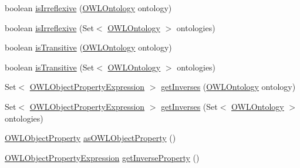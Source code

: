 \begin{DoxyCompactItemize}
\item 
boolean \hyperlink{interfaceorg_1_1semanticweb_1_1owlapi_1_1model_1_1_o_w_l_object_property_expression_a9dac56c597c83874b6a23fb84409faa5}{is\-Irreflexive} (\hyperlink{interfaceorg_1_1semanticweb_1_1owlapi_1_1model_1_1_o_w_l_ontology}{O\-W\-L\-Ontology} ontology)
\item 
boolean \hyperlink{interfaceorg_1_1semanticweb_1_1owlapi_1_1model_1_1_o_w_l_object_property_expression_a820c2a3db23b2416949239ac1141fb5b}{is\-Irreflexive} (Set$<$ \hyperlink{interfaceorg_1_1semanticweb_1_1owlapi_1_1model_1_1_o_w_l_ontology}{O\-W\-L\-Ontology} $>$ ontologies)
\item 
boolean \hyperlink{interfaceorg_1_1semanticweb_1_1owlapi_1_1model_1_1_o_w_l_object_property_expression_acfe60cc89882d04b17c6fb54017e360a}{is\-Transitive} (\hyperlink{interfaceorg_1_1semanticweb_1_1owlapi_1_1model_1_1_o_w_l_ontology}{O\-W\-L\-Ontology} ontology)
\item 
boolean \hyperlink{interfaceorg_1_1semanticweb_1_1owlapi_1_1model_1_1_o_w_l_object_property_expression_a8e7fcc73fe6a78c637a12997a713c186}{is\-Transitive} (Set$<$ \hyperlink{interfaceorg_1_1semanticweb_1_1owlapi_1_1model_1_1_o_w_l_ontology}{O\-W\-L\-Ontology} $>$ ontologies)
\item 
Set$<$ \hyperlink{interfaceorg_1_1semanticweb_1_1owlapi_1_1model_1_1_o_w_l_object_property_expression}{O\-W\-L\-Object\-Property\-Expression} $>$ \hyperlink{interfaceorg_1_1semanticweb_1_1owlapi_1_1model_1_1_o_w_l_object_property_expression_ae37fb3e5568a0068ead3497cb940d537}{get\-Inverses} (\hyperlink{interfaceorg_1_1semanticweb_1_1owlapi_1_1model_1_1_o_w_l_ontology}{O\-W\-L\-Ontology} ontology)
\item 
Set$<$ \hyperlink{interfaceorg_1_1semanticweb_1_1owlapi_1_1model_1_1_o_w_l_object_property_expression}{O\-W\-L\-Object\-Property\-Expression} $>$ \hyperlink{interfaceorg_1_1semanticweb_1_1owlapi_1_1model_1_1_o_w_l_object_property_expression_a784782a196945318a43dc725044dfd27}{get\-Inverses} (Set$<$ \hyperlink{interfaceorg_1_1semanticweb_1_1owlapi_1_1model_1_1_o_w_l_ontology}{O\-W\-L\-Ontology} $>$ ontologies)
\item 
\hyperlink{interfaceorg_1_1semanticweb_1_1owlapi_1_1model_1_1_o_w_l_object_property}{O\-W\-L\-Object\-Property} \hyperlink{interfaceorg_1_1semanticweb_1_1owlapi_1_1model_1_1_o_w_l_object_property_expression_addf5964d798391e6df5938733fbb1858}{as\-O\-W\-L\-Object\-Property} ()
\item 
\hyperlink{interfaceorg_1_1semanticweb_1_1owlapi_1_1model_1_1_o_w_l_object_property_expression}{O\-W\-L\-Object\-Property\-Expression} \hyperlink{interfaceorg_1_1semanticweb_1_1owlapi_1_1model_1_1_o_w_l_object_property_expression_a84962cf3ab0c9c6c655d2977a6c6fc9c}{get\-Inverse\-Property} ()

\end{DoxyCompactItemize}

